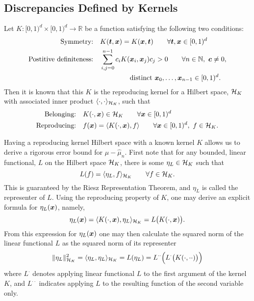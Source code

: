 \documentclass{svproc}
\begin{document}
\subsection{Discrepancies Defined by Kernels} \label{sec:kerdisc}
Let $K: [0,1)^d \times [0,1)^d \to \mathbb{R}$ be a function satisfying the following two conditions:
\begin{subequations} \label{eq:Kcond}
	\begin{align}
		\label{eq:KcondSym}
		\text{Symmetry:} \quad & K({\boldsymbol{t}},{\boldsymbol{x}}) = K({\boldsymbol{x}},{\boldsymbol{t}}) \qquad \forall {\boldsymbol{t}},{\boldsymbol{x}} \in [0,1)^d \\
		\nonumber
		\text{Postitive definiteness:} \quad & \sum_{i,j = 0}^{n-1} c_i K({\boldsymbol{x}}_i,{\boldsymbol{x}}_j) c_j > 0 \qquad  \forall n \in \mathbb{N}, \ {\boldsymbol{c}} \ne 0, \\
		& \qquad \qquad  \ \text{distinct } {\boldsymbol{x}}_0, \ldots, {\boldsymbol{x}}_{n-1} \in [0,1)^d. \label{eq:KcondPD}
	\end{align}
\end{subequations}
Then it is known \cite{Aro50} that this $K$ is the reproducing kernel for a Hilbert space, ${\mathcal{H}}_K$ with associated inner product $\langle \cdot, \cdot \rangle_{{\mathcal{H}}_K}$, such that
\begin{subequations}
	\begin{align}
	\text{Belonging:} \quad & K(\cdot,{\boldsymbol{x}}) \in {\mathcal{H}}_K \qquad \forall {\boldsymbol{x}} \in [0,1)^d \\
	\text{Reproducing:} \quad & f({\boldsymbol{x}}) = \langle K(\cdot,{\boldsymbol{x}}),f \rangle \qquad  \forall {\boldsymbol{x}} \in [0,1)^d, \ f \in {\mathcal{H}}_K.
\end{align}
\end{subequations}

Having a reproducing kernel Hilbert space with a known kernel $K$ allows us to derive a rigorous error bound for $\mu - \hat{\mu}_n$.  First note that for any bounded, linear functional, $L$ on the Hilbert space ${\mathcal{H}}_K$, there is some $\eta_L \in {\mathcal{H}}_K$ such that
\begin{equation*}
L(f) = \langle \eta_L , f \rangle_{{\mathcal{H}}_K} \qquad \forall f \in {\mathcal{H}}_K.
\end{equation*}
This is guaranteed by the Riesz Representation Theorem, and $\eta_L$ is called the representer of $L$.  Using the reproducing property of $K$, one may derive an explicit formula for $\eta_L({\boldsymbol{x}})$, namely,
\begin{equation*}
\eta_L({\boldsymbol{x}}) = \langle K(\cdot, {\boldsymbol{x}}), \eta_L \rangle_{{\mathcal{H}}_K} = L\bigl( K(\cdot,{\boldsymbol{x}}) \bigr).
\end{equation*}
From this expression for $\eta_L({\boldsymbol{x}})$ one may then calculate the squared norm of the linear functional $L$ as the squared norm of its representer
\begin{equation} \label{eq:sqnormL}
	\lVert \eta_L \rVert_{{\mathcal{H}}_K}^2 = \langle\eta_L, \eta_L \rangle_{{\mathcal{H}}_K} = L(\eta_L) = L^{\cdot\cdot} \Bigl(L^{\cdot}\bigl( K(\cdot,\cdot \cdot) \bigr) \Bigr)
\end{equation}
where $L^\cdot$ denotes applying linear functional $L$ to the first argument of the kernel $K$, and $L^{\cdot\cdot}$ indicates applying $L$ to the resulting function of the second variable only. 
\end{document}
